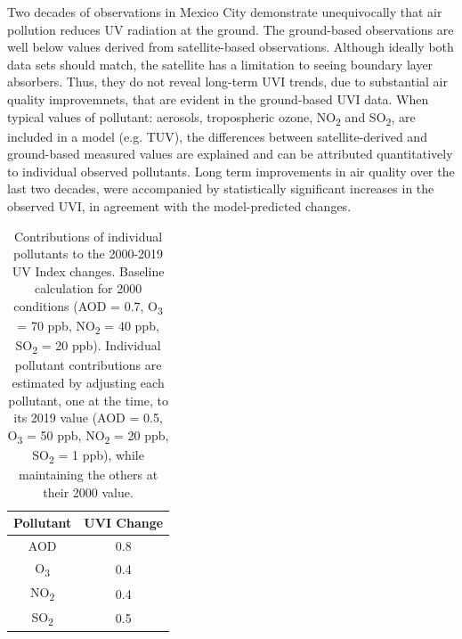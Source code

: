 \documentclass[journal=jacsat,manuscript=article]{achemso}
\begin{document}
Two decades of observations in Mexico City demonstrate unequivocally
that air pollution reduces UV radiation at the ground. The ground-based
observations are well below values derived from satellite-based
observations. Although ideally both data sets should match,
the satellite has a limitation to seeing boundary layer absorbers.
Thus, they do not reveal long-term UVI trends, due to substantial air quality improvemnets, that are evident in the ground-based UVI data.
When typical values of pollutant: aerosols,
tropospheric ozone, NO\textsubscript{2}
and SO\textsubscript{2}, are included in a model (e.g. TUV), the
differences between satellite-derived and ground-based measured values
are explained and can be attributed quantitatively to individual
observed pollutants. Long term improvements in air quality over the last two decades,
were accompanied by statistically significant increases in the
observed UVI, in agreement with the model-predicted changes.


\begin{table}[H]
  \centering
  \begin{tabular}{cc}
    \hline
    Pollutant           & UVI Change \\ \hline
    AOD                 & 0.8        \\
    O\textsubscript{3}  & 0.4        \\
    NO\textsubscript{2} & 0.4        \\
    SO\textsubscript{2} & 0.5        \\ \hline
  \end{tabular}
  \caption{Contributions of individual pollutants to the 2000-2019 UV Index changes. Baseline calculation for 2000 conditions (AOD = 0.7, O\textsubscript{3} = 70 ppb, NO\textsubscript{2} = 40 ppb, SO\textsubscript{2} = 20 ppb). Individual pollutant contributions are estimated by adjusting each pollutant, one at the time, to its 2019 value (AOD = 0.5, O\textsubscript{3} = 50 ppb, NO\textsubscript{2} = 20 ppb, SO\textsubscript{2} = 1 ppb), while maintaining the others at their 2000 value.}
  \label{table:year2000-2019}
\end{table}
\end{document}
